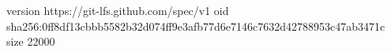 version https://git-lfs.github.com/spec/v1
oid sha256:0ff8df13cbbb5582b32d074ff9e3afb77d6e7146c7632d42788953c47ab3471c
size 22000
